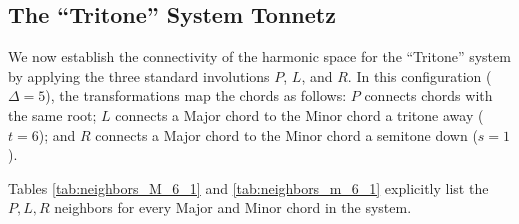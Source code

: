 \documentclass[12pt,letterpaper]{amsart}
\begin{document}
\subsection{The ``Tritone'' System Tonnetz}

We now establish the connectivity of the harmonic space for the ``Tritone'' system by applying the three standard involutions $P$, $L$, and $R$. In this configuration ($\Delta=5$), the transformations map the chords as follows: $P$ connects chords with the same root; $L$ connects a Major chord to the Minor chord a tritone away ($t=6$); and $R$ connects a Major chord to the Minor chord a semitone down ($s=1$).

Tables \ref{tab:neighbors_M_6_1} and \ref{tab:neighbors_m_6_1} explicitly list the $P, L, R$ neighbors for every Major and Minor chord in the system.
\end{document}
